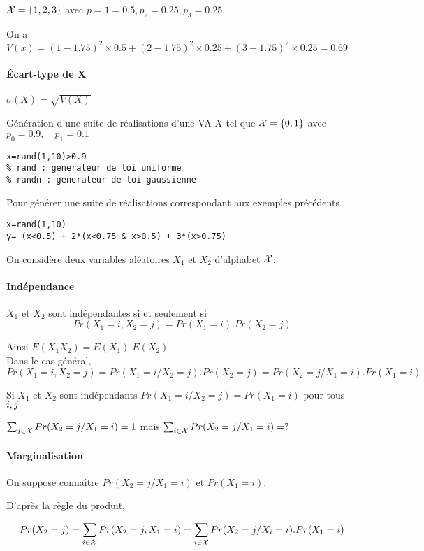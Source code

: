 \documentclass[main.tex]{subfile}
\begin{document}
\begin{example}[(suite)]
$\mathcal{X}=\{1,2,3\}$ avec $p=1 = 0.5, p_2=0.25, p_3=0.25$.

On a $V(x) = (1-1.75)^2\times0.5 + (2-1.75)^2\times0.25 + (3-1.75)^2\times0.25=0.69$
\end{example}

\paragraph{Écart-type de X} $ \sigma(X) = \sqrt{V(X)}$

\medskip
\begin{example}
Génération d'une suite de réalisations d'une VA $X$ tel que $\mathcal{X}=\{0,1\}$ avec $p_0=0.9,\quad p_1=0.1$

\begin{verbatim}
x=rand(1,10)>0.9
% rand : generateur de loi uniforme
% randn : generateur de loi gaussienne
\end{verbatim}

\noindent Pour générer une suite de réalisations correspondant aux exemples précédents

\begin{verbatim}
x=rand(1,10)
y= (x<0.5) + 2*(x<0.75 & x>0.5) + 3*(x>0.75)
\end{verbatim}
\end{example}

\medskip
On considère deux variables aléatoires $X_1$ et $X_2$ d'alphabet $\mathcal{X}$.

\paragraph{Indépendance}
$X_1$ et $X_2$ sont indépendantes si et seulement si \[Pr(X_1=i,X_2=j)=Pr(X_1=i).Pr(X_2=j)\]

Ainsi $E(X_1X_2)=E(X_1).E(X_2)$\\

Dans le cas général,
\[Pr(X_1=i,X_2=j)=Pr(X_1=i / X_2=j).Pr(X_2=j)=Pr(X_2=j / X_1 =i).Pr(X_1=i)\]

Si $X_1$ et $X_2$ sont indépendants $Pr(X_1=i/X_2=j)=Pr(X_1=i)$ pour tous $i,j$

$\sum_{j\in\mathcal{X}}Pr(X_2=j/X_1=i)=1$ mais $\sum_{i\in\mathcal{X}} Pr(X_2=j/X_1=i)= ?$

\paragraph{Marginalisation}

On suppose connaître $Pr(X_2=j/X_1=i)$ et $Pr(X_1=i)$.

D'après la règle du produit,

\[Pr(X_2=j)=\sum_{i\in\mathcal{X}} Pr(X_2=j,X_1=i) = \sum_{i\in\mathcal{X}} Pr(X_2=j/X_i=i).Pr(X_1=i)\]
\end{document}
